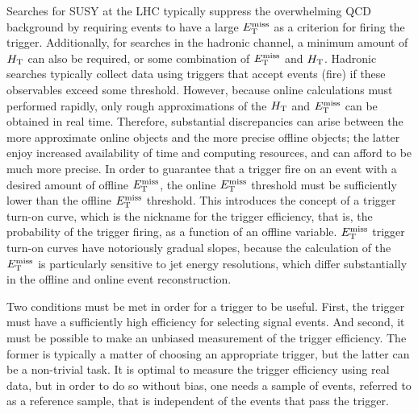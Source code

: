 \label{sec:hadronictrigger}
Searches for SUSY at the LHC typically suppress the overwhelming QCD background by requiring events to have a large $E_{\text{T}}^{\rm miss}$ as a criterion for firing the trigger. Additionally, for searches in the hadronic channel, a minimum amount of $H_{\rm T}$ can also be required, or some combination of $E_{\text{T}}^{\rm miss}$ and $H_{\rm T}$. Hadronic searches typically collect data using triggers that accept events (fire) if these observables exceed some threshold. However, because online calculations must performed rapidly, only rough approximations of the $H_{\rm T}$ and $E_{\text{T}}^{\rm miss}$ can be obtained in real time. Therefore, substantial discrepancies can arise between the more approximate online objects and the more precise offline objects; the latter enjoy increased availability of time and computing resources, and can afford to be much more precise. In order to guarantee that a trigger fire on an event with a desired amount of offline $E_{\text{T}}^{\rm miss}$, the online $E_{\text{T}}^{\rm miss}$ threshold must be sufficiently lower than the offline $E_{\text{T}}^{\rm miss}$ threshold. This introduces the concept of a trigger turn-on curve, which is the nickname for the trigger efficiency, that is, the probability of the trigger firing, as a function of an offline variable. $E_{\text{T}}^{\rm miss}$ trigger turn-on curves have notoriously gradual slopes, because the calculation of the $E_{\text{T}}^{\rm miss}$ is particularly sensitive to jet energy resolutions, which differ substantially in the offline and online event reconstruction.

Two conditions must be met in order for a trigger to be useful. First, the trigger must have a sufficiently high efficiency for selecting signal events. And second, it must be possible to make an unbiased measurement of the trigger efficiency. The former is typically a matter of choosing an appropriate trigger, but the latter can be a non-trivial task. It is optimal to measure the trigger efficiency using real data, but in order to do so without bias, one needs a sample of events, referred to as a reference sample, that is independent of the events that pass the trigger. 

